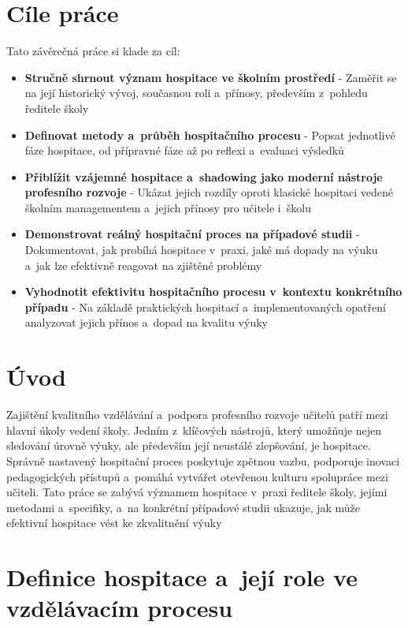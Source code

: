 \setcounter{page}{1}


\section*{Cíle práce}

Tato závěrečná práce si klade za cíl:
\begin{itemize}
\item \textbf{Stručně shrnout význam hospitace ve školním prostředí} - Zaměřit se na její historický vývoj, současnou roli a~přínosy, především z~pohledu ředitele školy
\item \textbf{Definovat metody a~průběh hospitačního procesu} - Popsat jednotlivé fáze hospitace, od přípravné fáze až po reflexi a~evaluaci výsledků
\item \textbf{Přiblížit vzájemné hospitace a~shadowing jako moderní nástroje profesního rozvoje} - Ukázat jejich rozdíly oproti klasické hospitaci vedené školním managementem a~jejich přínosy pro učitele i~školu
\item \textbf{Demonstrovat reálný hospitační proces na případové studii} - Dokumentovat, jak probíhá hospitace v~praxi, jaké má dopady na výuku a~jak lze efektivně reagovat na zjištěné problémy
\item \textbf{Vyhodnotit efektivitu hospitačního procesu v~kontextu konkrétního případu} - Na základě praktických hospitací a~implementovaných opatření analyzovat jejich přínos a~dopad na kvalitu výuky
\end{itemize}
\newpage 


\section*{Úvod}
Zajištění kvalitního vzdělávání a~podpora profesního rozvoje učitelů patří mezi hlavní úkoly vedení školy. Jedním z~klíčových nástrojů, který umožňuje nejen sledování úrovně výuky, ale především její neustálé zlepšování, je hospitace. Správně nastavený hospitační proces poskytuje zpětnou vazbu, podporuje inovaci pedagogických přístupů a~pomáhá vytvářet otevřenou kulturu spolupráce mezi učiteli. Tato práce se zabývá významem hospitace v~praxi ředitele školy, jejími metodami a~specifiky, a~na konkrétní případové studii ukazuje, jak může efektivní hospitace vést ke zkvalitnění výuky


\section{Definice hospitace a~její role ve vzdělávacím procesu}

